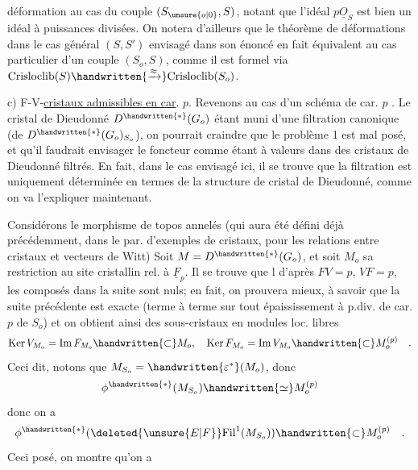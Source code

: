 déformation au cas du couple $(S_{\unsure{o|0}},S)$,  notant que l'idéal $p\underline{O}_S$ est bien un idéal à puissances divisées. On notera d'ailleurs que le théorème de déformations dans le cas  général $(S,S')$ envisagé dans son énoncé  en fait équivalent au cas particulier d'un couple $(S_o,S)$, comme il est formel via $\mathrm{Crisloclib}(S)\handwritten{\xrightarrow{\approx}}\mathrm{Crisloclib}(S_o)$.


c) F-V-\uline{cristaux admissibles en car}. $p$. Revenons au cas d'un schéma de car. $p$ . Le cristal de Dieudonné $D^{\handwritten{*}}(G_o)$ étant muni d'une filtration canonique (de $D^{\handwritten{*}}(G_o)_{S_o}$), on pourrait craindre que le problème 1 est mal posé, et qu'il faudrait envisager le foncteur comme étant à valeurs dans des cristaux de Dieudonné filtrés. En fait, dans le cas envisagé ici, il se trouve que la filtration est uniquement déterminée en termes de la structure de cristal de Dieudonné, comme on va l'expliquer maintenant.

Considérons le morphisme de topos annelés (qui aura été défini déjà précédemment, dans le par. d'exemples de cristaux, pour les relations entre cristaux et vecteurs de Witt)
Soit $M=D^{\handwritten{*}}(G_o)$, et soit $M_o$ sa restriction au site cristallin rel. à $\underline{F}_p$. Il se trouve que l d'après $FV=p$, $VF=p$, les composés dans la suite
sont nuls; en fait, on prouvera mieux, à savoir que  la suite précédente est exacte (terme à terme sur tout épaississement à p.div. de car.$p$ de $S_o$) et on obtient ainsi des sous-cristaux en modules loc. libres
\[
\operatorname{Ker} V_{M_o}=\operatorname{Im} F_{M_o}\handwritten{\subset}M_o,\quad
\operatorname{Ker} F_{M_o}=\operatorname{Im} V_{M_o}\handwritten{\subset}M_o^{(p)}\quad .
\]
Ceci dit,  notons que $M_{S_o}=\handwritten{\varepsilon^*}(M_o)$, donc
\[
\phi^{\handwritten{*}}(M_{S_o})\handwritten{\simeq} M_o^{(p)}
\]
donc on a
\[
\phi^{\handwritten{*}}(\deleted{\unsure{E|F}}\mathrm{Fil}^1(M_{S_o}))\handwritten{\subset} M_o^{(p)}\quad .
\]
Ceci posé, on montre qu'on a
